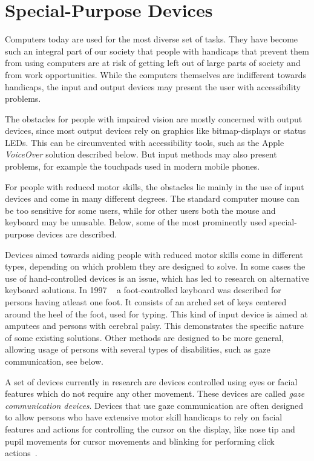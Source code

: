 
\section{Special-Purpose Devices}

Computers today are used for the most diverse set of tasks. They have become such an integral part of our society that people with handicaps that prevent them from using computers are at risk of getting left out of large parts of society and from work opportunities. While the computers themselves are indifferent towards handicaps, the input and output devices may present the user with accessibility problems.

The obstacles for people with impaired vision are mostly concerned with output devices, since most output devices rely on graphics like bitmap-displays or status LEDs. This can be circumvented with accessibility tools, such as the Apple \emph{VoiceOver} solution described below. But input methods may also present problems, for example the touchpads used in modern mobile phones.

For people with reduced motor skills, the obstacles lie mainly in the use of input devices and come in many different degrees. The standard computer mouse can be too sensitive for some users, while for other users both the mouse and keyboard may be unusable. Below, some of the most prominently used special-purpose devices are described.

Devices aimed towards aiding people with reduced motor skills come in different types, depending on which problem they are designed to solve. In some cases the use of hand-controlled devices is an issue, which has led to research on alternative keyboard solutions. In 1997 ~\cite{583209} a foot-controlled keyboard was described for persons having atleast one foot. It consists of an arched set of keys centered around the heel of the foot, used for typing. This kind of input device is aimed at amputees and persons with cerebral palsy. This demonstrates the specific nature of some existing solutions. Other methods are designed to be more general, allowing usage of persons with several types of disabilities, such as gaze communication, see below. 

A set of devices currently in research are devices controlled using eyes or facial features which do not require any other movement. These devices are called \emph{gaze communication devices}. Devices that use gaze communication are often designed to allow persons who have extensive motor skill handicaps to rely on facial features and actions for controlling the cursor on the display, like nose tip and pupil movements for cursor movements and blinking for performing click actions~\cite{ieee6398171, conf/itng/AraiM11a}.

